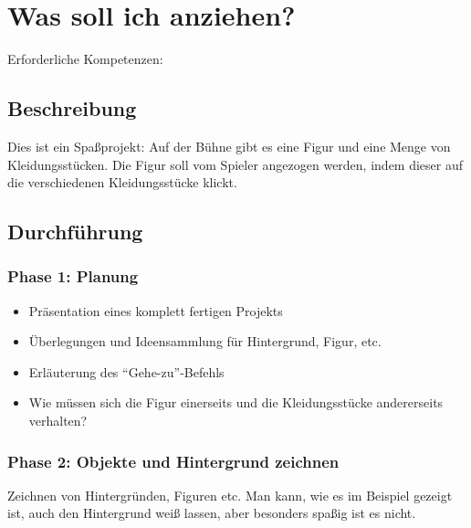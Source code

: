 \section{Was soll ich anziehen?}\label{was-soll-ich-anziehen}

Erforderliche Kompetenzen:

\begin{figure}[ht]
    \centering 
    \caption[\Sectionname]{\Sectionname}
\end{figure}

\subsection{Beschreibung}\label{beschreibung}

Dies ist ein Spaßprojekt: Auf der Bühne gibt es eine Figur und eine
Menge von Kleidungsstücken. Die Figur soll vom Spieler angezogen werden,
indem dieser auf die verschiedenen Kleidungsstücke klickt.

\subsection{Durchführung}\label{durchfuxfchrung}

\subsubsection{Phase 1: Planung}\label{phase-1-planung}

\begin{itemize}
\item
  Präsentation eines komplett fertigen Projekts
\item
  Überlegungen und Ideensammlung für Hintergrund, Figur, etc.
\item
  Erläuterung des ``Gehe-zu''-Befehls
\item
  Wie müssen sich die Figur einerseits und die Kleidungsstücke
  andererseits verhalten?
\end{itemize}

\subsubsection{Phase 2: Objekte und Hintergrund
zeichnen}\label{phase-2-objekte-und-hintergrund-zeichnen}

Zeichnen von Hintergründen, Figuren etc. Man kann, wie es im Beispiel
gezeigt ist, auch den Hintergrund weiß lassen, aber besonders spaßig ist
es nicht.

